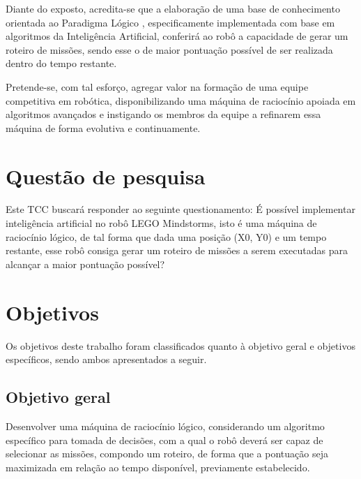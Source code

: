 Diante do exposto, acredita-se que a elaboração de uma base de conhecimento orientada ao Paradigma Lógico \cite{tucker2009linguagens}, especificamente implementada com base em algoritmos da Inteligência Artificial, conferirá ao robô a capacidade de gerar um roteiro de missões, sendo esse o de maior pontuação possível de ser realizada dentro do tempo restante.

Pretende-se, com tal esforço, agregar valor na formação de uma equipe competitiva em robótica, disponibilizando uma máquina de raciocínio apoiada em algoritmos avançados e instigando os membros da equipe a refinarem essa máquina de forma evolutiva e continuamente.

\section{Questão de pesquisa}

Este TCC buscará responder ao seguinte questionamento: É possível implementar inteligência artificial no robô LEGO Mindstorms, isto é uma máquina de raciocínio lógico, de tal forma que dada uma posição (X0, Y0) e um tempo restante, esse robô consiga gerar um roteiro de missões a serem executadas para alcançar a maior pontuação possível?

\section{Objetivos}
Os objetivos deste trabalho foram classificados quanto à objetivo geral e objetivos específicos, sendo ambos apresentados a seguir.

\subsection{Objetivo geral}
Desenvolver uma máquina de raciocínio lógico, considerando um algoritmo específico para tomada de decisões, com a qual o robô deverá ser capaz de selecionar as missões, compondo um roteiro, de forma que a pontuação seja maximizada em relação ao tempo disponível, previamente estabelecido.

